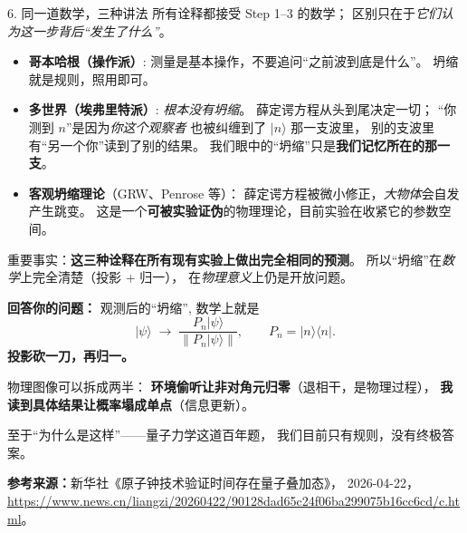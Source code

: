 \documentclass[11pt,a4paper]{ctexart}
\begin{document}
\begin{stepblock}{6. 同一道数学，三种讲法}
所有诠释都接受 Step 1--3 的数学；
区别只在于\emph{它们认为这一步背后``发生了什么''}。

\begin{itemize}
  \item \textbf{哥本哈根（操作派）}: 
        测量是基本操作，不要追问``之前波到底是什么''。
        坍缩就是规则，照用即可。
  \item \textbf{多世界（埃弗里特派）}: 
        \emph{根本没有坍缩}。
        薛定谔方程从头到尾决定一切；
        ``你测到 $n$''是因为\emph{你这个观察者} 也被纠缠到了 $\lvert n\rangle$ 那一支波里，
        别的支波里有``另一个你''读到了别的结果。
        我们眼中的``坍缩''只是\textbf{我们记忆所在的那一支}。
  \item \textbf{客观坍缩理论}（GRW、Penrose 等）：
        薛定谔方程被微小修正，\emph{大物体}会自发产生跳变。
        这是一个\textbf{可被实验证伪}的物理理论，目前实验在收紧它的参数空间。
\end{itemize}

\smallskip
重要事实：\textbf{这三种诠释在所有现有实验上做出完全相同的预测}。
所以``坍缩''在\emph{数学}上完全清楚（投影 + 归一），
在\emph{物理意义}上仍是开放问题。
\end{stepblock}

\begin{keypointblock}
\textbf{回答你的问题：}
观测后的``坍缩'', 数学上就是
\[
  \lvert\psi\rangle
  \;\to\;
  \frac{P_n\lvert\psi\rangle}{\|P_n\lvert\psi\rangle\|},
  \qquad
  P_n = \lvert n\rangle\langle n\rvert.
\]
\textbf{投影砍一刀，再归一。}
\smallskip

物理图像可以拆成两半：
\textbf{环境偷听让非对角元归零}（退相干，是物理过程），
\textbf{我读到具体结果让概率塌成单点}（信息更新）。
\smallskip

至于``为什么是这样''——量子力学这道百年题，
我们目前只有规则，没有终极答案。
\end{keypointblock}

\bigskip
\noindent\textbf{参考来源：}新华社《原子钟技术验证时间存在量子叠加态》，
2026-04-22，
\url{https://www.news.cn/liangzi/20260422/90128dad65c24f06ba299075b16cc6cd/c.html}。
\end{document}

